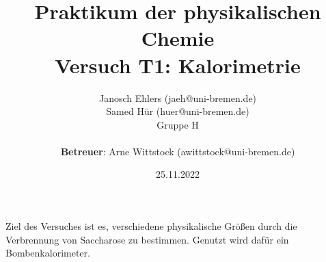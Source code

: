 \documentclass[a4paper, 11pt]{article}
\title{Praktikum der physikalischen Chemie\\\large Versuch T1: Kalorimetrie}
\author{Janosch Ehlers (jaeh@uni-bremen.de)\\ Samed Hür (huer@uni-bremen.de)\\\small Gruppe H \\\\ \textbf{Betreuer}: Arne Wittstock (awittstock@uni-bremen.de)}
\date{25.11.2022}
\begin{document}
	\maketitle
	\thispagestyle{empty}
	\clearpage
	\newpage
	\tableofcontents
	\thispagestyle{empty}
	\newpage
	Ziel des Versuches ist es, verschiedene physikalische Größen durch die Verbrennung von Saccharose zu bestimmen. Genutzt wird dafür ein Bombenkalorimeter.


\newpage

\newpage



\printbibliography
\end{document}
